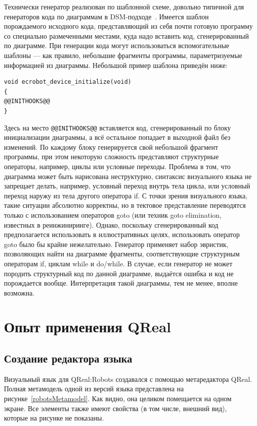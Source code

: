 \documentclass[a4paper]{article}
\begin{document}
Технически генератор реализован по шаблонной схеме, довольно типичной для генераторов кода по диаграммам в DSM-подходе~\cite{theBook}. Имеется шаблон порождаемого исходного кода, представляющий из себя почти готовую программу со специально размеченными местами, куда надо вставить код, сгенерированный по диаграмме. При генерации кода могут использоваться вспомогательные шаблоны --- как правило, небольшие фрагменты программы, параметризуемые информацией из диаграммы. Небольшой пример шаблона приведён ниже:
\begin{verbatim}
void ecrobot_device_initialize(void)
{
@@INITHOOKS@@
}
\end{verbatim}
Здесь на место \verb|@@INITHOOKS@@| вставляется код, сгенерированный по блоку инициализации диаграммы, а всё остальное попадает в выходной файл без изменений. По каждому блоку генерируется свой небольшой фрагмент программы, при этом некоторую сложность представляют структурные операторы, например, циклы или условные переходы. Проблема в том, что диаграмма может быть нарисована неструктурно, синтаксис визуального языка не запрещает делать, например, условный переход внутрь тела цикла, или условный переход наружу из тела другого оператора if. С точки зрения визуального языка, такие ситуации абсолютно корректны, но в тектовое представление переводятся только с использованием операторов goto (или техник goto elimination, известных в реинжиниринге). Однако, поскольку сгенерированный код предполагается использовать в иллюстративных целях, использовать оператор goto было бы крайне нежелательно. Генератор применяет набор эвристик, позволяющих найти на диаграмме фрагменты, соответствующие структурным операторам if, циклам while и do/while. В случае, если генератор не может породить структурный код по данной диаграмме, выдаётся ошибка и код не порождается вообще. Интерпретация такой диаграммы, тем не менее, вполне возможна.

\section{Опыт применения QReal}
\subsection{Создание редактора языка}
Визуальный язык для QReal:Robots создавался с помощью метаредактора QReal. Полная метамодель одной из версий языка представлена на рисунке~\ref{robotsMetamodel}. Как видно, она целиком помещается на одном экране. Все элементы также имеют свойства (в том числе, внешний вид), которые на рисунке не показаны.
\end{document}
